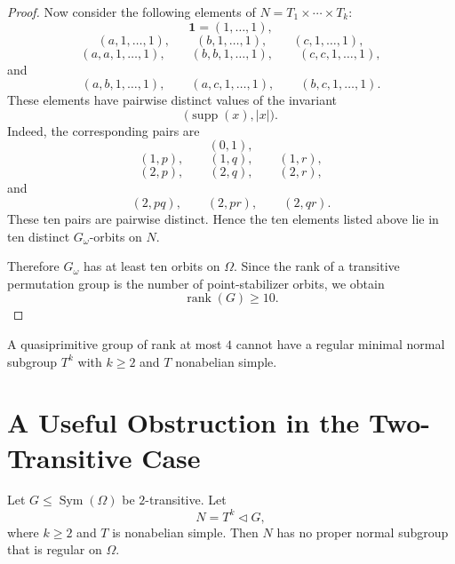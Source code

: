 \begin{proof}
        Now consider the following elements of \(N=T_1\times\cdots\times T_k\):
        \[
            \mathbf{1}=(1,\ldots,1),
        \]
        \[
            (a,1,\ldots,1),\qquad
            (b,1,\ldots,1),\qquad
            (c,1,\ldots,1),
        \]
        \[
            (a,a,1,\ldots,1),\qquad
            (b,b,1,\ldots,1),\qquad
            (c,c,1,\ldots,1),
        \]
        and
        \[
            (a,b,1,\ldots,1),\qquad
            (a,c,1,\ldots,1),\qquad
            (b,c,1,\ldots,1).
        \]
        These elements have pairwise distinct values of the invariant
        \[
            \bigl(\operatorname{supp}(x), |x|\bigr).
        \]
        Indeed, the corresponding pairs are
        \[
            (0,1),
        \]
        \[
            (1,p),\qquad (1,q),\qquad (1,r),
        \]
        \[
            (2,p),\qquad (2,q),\qquad (2,r),
        \]
        and
        \[
            (2,pq),\qquad (2,pr),\qquad (2,qr).
        \]
        These ten pairs are pairwise distinct. Hence the ten elements listed above lie in ten
        distinct \(G_\omega\)-orbits on \(N\).
        
        Therefore \(G_\omega\) has at least ten orbits on \(\Omega\). Since the rank of a
        transitive permutation group is the number of point-stabilizer orbits, we obtain
        \[
            \operatorname{rank}(G)\geq 10.
        \]
        \end{proof} 



\begin{corollary}
A quasiprimitive group of rank at most \(4\) cannot have a regular minimal normal
subgroup \(T^k\) with \(k\geq 2\) and \(T\) nonabelian simple.
\end{corollary}

\section{A Useful Obstruction in the Two-Transitive Case}

\begin{lemma}
Let \(G\leq \operatorname{Sym}(\Omega)\) be \(2\)-transitive. Let
\[
N=T^k \lhd G,
\]
where \(k\geq 2\) and \(T\) is nonabelian simple. Then \(N\) has no proper normal
subgroup that is regular on \(\Omega\).
\end{lemma}

